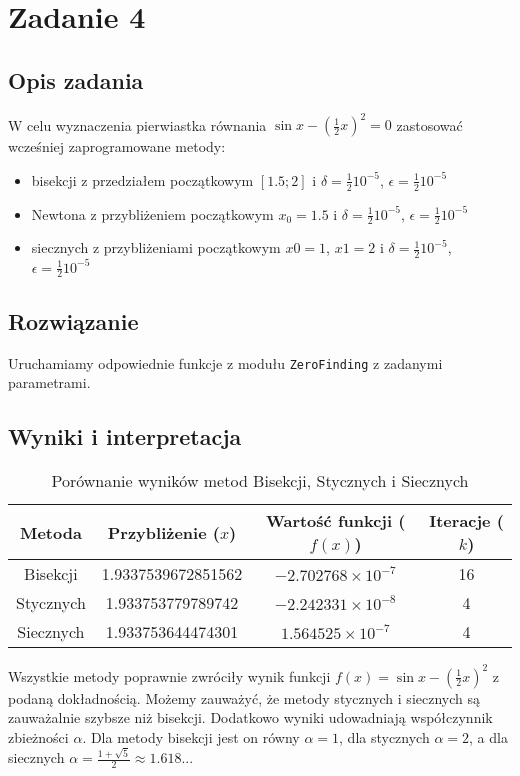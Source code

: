 \documentclass{article}
\begin{document}
\section*{Zadanie 4}
\subsection*{Opis zadania}
W celu wyznaczenia pierwiastka równania $\sin x - \left(\frac{1}{2} x\right)^2 = 0$ zastosować wcześniej zaprogramowane metody:
    \begin{itemize}
        \item bisekcji z przedziałem początkowym $[1.5;2]$ i $\delta = \frac{1}{2} 10^{-5}$, $\epsilon = \frac{1}{2} 10^{-5}$
       \item Newtona z przybliżeniem początkowym $x_0 = 1.5$ i $\delta = \frac{1}{2} 10^{-5}$, $\epsilon = \frac{1}{2} 10^{-5}$
       \item siecznych z przybliżeniami początkowym $x0 = 1$, $x1 = 2$ i $\delta = \frac{1}{2} 10^{-5}$, $\epsilon = \frac{1}{2} 10^{-5}$
    \end{itemize}
\subsection*{Rozwiązanie}
Uruchamiamy odpowiednie funkcje z modułu \texttt{ZeroFinding} z zadanymi parametrami.
\subsection*{Wyniki i interpretacja}
\begin{table}[h]
\centering
\begin{tabular}{|c|c|c|c|}
\hline
\textbf{Metoda} & \textbf{Przybliżenie ($x$)} & \textbf{Wartość funkcji ($f(x)$)} & \textbf{Iteracje ($k$)} \\ \hline
Bisekcji       & 1.9337539672851562          & $-2.702768 \times 10^{-7}$        & 16                                          \\ \hline
Stycznych        & 1.933753779789742           & $-2.242331 \times 10^{-8}$        & 4                                              \\ \hline
Siecznych        & 1.933753644474301           & $1.564525 \times 10^{-7}$         & 4                                             \\ \hline
\end{tabular}
\caption{Porównanie wyników metod Bisekcji, Stycznych i Siecznych}
\label{tab:metody}
\end{table}
Wszystkie metody poprawnie zwróciły wynik funkcji $f(x)=\sin x - \left(\frac{1}{2} x\right)^2$ z podaną dokładnością. Możemy zauważyć, że metody stycznych i siecznych są zauważalnie szybsze niż bisekcji. Dodatkowo wyniki udowadniają współczynnik zbieżności $\alpha$. Dla metody bisekcji jest on równy $\alpha=1$, dla stycznych $\alpha=2$, a dla siecznych $\alpha=\frac{1+\sqrt{5}}{2}\approx1.618...$ 
\end{document}
